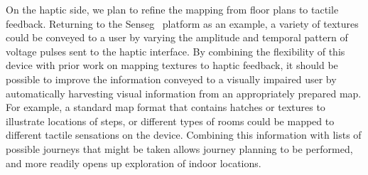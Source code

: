 On the haptic side, we plan to refine the mapping from floor plans to tactile feedback. Returning to the Senseg\texttrademark~ platform as an example, a variety of textures could be conveyed to a user by varying the amplitude and temporal pattern of voltage pulses sent to the haptic interface. By combining the flexibility of this device with prior work on mapping textures to haptic feedback, it should be possible to improve the information conveyed to a visually impaired user by automatically harvesting visual information from an appropriately prepared map. For example, a standard map format that contains hatches or textures to illustrate locations of steps, or different types of rooms could be mapped to different tactile sensations on the device. Combining this information with lists of possible journeys that might be taken allows journey planning to be performed, and more readily opens up exploration of indoor locations.


